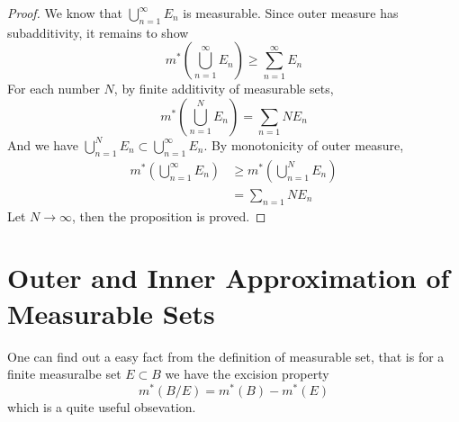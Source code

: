 \documentclass[lang=en, 12pt]{elegantbook}
\begin{document}
            \begin{proof}
                We know that $\bigcup_{n=1}^{\infty} E_n$ is measurable. Since outer measure has subadditivity, it remains to show 
                \begin{equation}
                    m^*(\bigcup_{n=1}^{\infty} E_n) \geq \sum_{n=1}^{\infty} E_n \label{caa}
                \end{equation}
                For each number $N$, by finite additivity of measurable sets, 
                $$ m^*(\bigcup_{n=1}^{N} E_n) = \sum_{n=1}{N} E_n$$
                And we have $\bigcup_{n=1}^{N} E_n \subset \bigcup_{n=1}^{\infty} E_n$. By monotonicity of outer measure,
                \begin{equation*}
                    \begin{aligned}
                        m^*(\bigcup_{n=1}^{\infty} E_n) &\geq m^*(\bigcup_{n=1}^{N} E_n)\\
                        &= \sum_{n=1}{N} E_n
                    \end{aligned}
                \end{equation*}
                Let $N \to \infty$, then the proposition is proved.
            \end{proof}
        \section{Outer and Inner Approximation of Measurable Sets}
            One can find out a easy fact from the definition of measurable set, that is for a finite measuralbe set $E \subset B$ 
        we have the excision property
            \begin{equation*}
                m^*(B/E) = m^*(B) - m^*(E)
            \end{equation*}
            which is a quite useful obsevation. 
\end{document}
